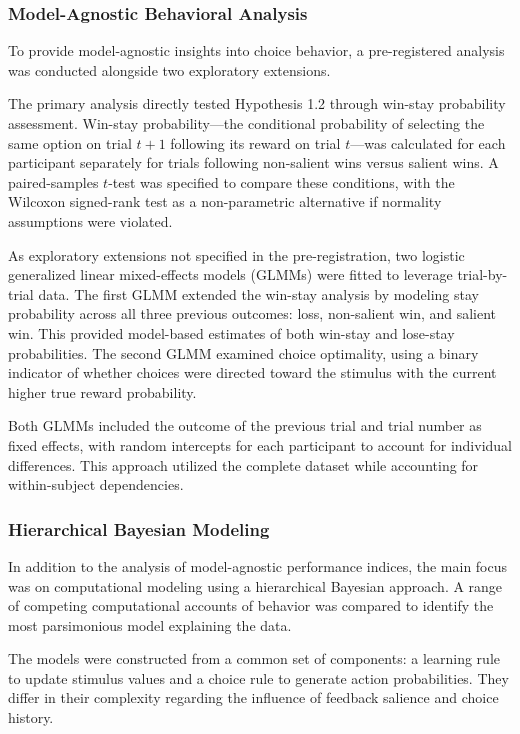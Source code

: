 \subsubsection{Model-Agnostic Behavioral Analysis}

To provide model-agnostic insights into choice behavior, a pre-registered analysis was conducted alongside two exploratory extensions.

The primary analysis directly tested Hypothesis 1.2 through win-stay probability assessment. Win-stay probability—the conditional probability of selecting the same option on trial $t+1$ following its reward on trial $t$—was calculated for each participant separately for trials following non-salient wins versus salient wins. A paired-samples $t$-test was specified to compare these conditions, with the Wilcoxon signed-rank test as a non-parametric alternative if normality assumptions were violated.

As exploratory extensions not specified in the pre-registration, two logistic generalized linear mixed-effects models (GLMMs) were fitted to leverage trial-by-trial data. The first GLMM extended the win-stay analysis by modeling stay probability across all three previous outcomes: loss, non-salient win, and salient win. This provided model-based estimates of both win-stay and lose-stay probabilities. The second GLMM examined choice optimality, using a binary indicator of whether choices were directed toward the stimulus with the current higher true reward probability.

Both GLMMs included the outcome of the previous trial and trial number as fixed effects, with random intercepts for each participant to account for individual differences. This approach utilized the complete dataset while accounting for within-subject dependencies.

\subsubsection{Hierarchical Bayesian Modeling}

In addition to the analysis of model-agnostic performance indices, the main focus was on computational modeling using a hierarchical Bayesian approach. A range of competing computational accounts of behavior was compared to identify the most parsimonious model explaining the data.

The models were constructed from a common set of components: a learning rule to update stimulus values and a choice rule to generate action probabilities. They differ in their complexity regarding the influence of feedback salience and choice history.

